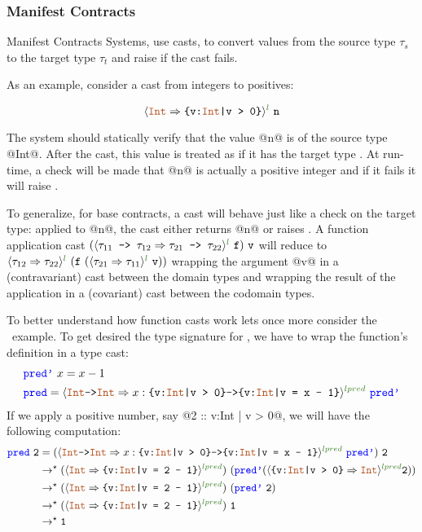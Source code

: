 \subsubsection{Manifest Contracts}

Manifest Contracts Systems\cite{Greenberg12}, use casts,
to convert values from the source type $\tau_s$ 
to the target type $\tau_t$ and raise 
if the cast fails.

As an example, consider a cast from integers to positives:

$$
\ecast{\tyint}{\ttpos}{l} \ \texttt{n}
$$

The system should statically verify that the value @n@ is 
of the source type @Int@.
After the cast, this value is treated as
if it has the target type \ttpos.
At run-time, a check will be made that @n@ 
is actually a positive integer and if it fails it will raise .

To generalize, for base contracts, a cast will behave just like a check on the target type: 
applied to @n@, the cast either returns @n@ or raises  . 
%
A function application cast 
$(\ecast{\tau_{11} \texttt{ -> } \tau_{12}}{\tau_{21} \texttt{ -> } \tau_{22}}{l} \ \texttt{f} ) \ \texttt{v}$
will reduce to 
$\ecast{\tau_{12}}{\tau_{22}}{l}\ (
	\texttt{f} \ 
	(
		\ecast{\tau_{21}}{\tau_{11}}{l} 
		\ \texttt{v}
	)
)$
wrapping the argument @v@ in a (contravariant) cast between the domain types
and wrapping the result of the application in a (covariant) cast between the
codomain types.

To better understand how function casts work lets once more consider 
the \predname\ example.
%
To get desired the type signature for \predname, 
we have to wrap the function's definition 
in a type cast:
\begin{align*}
& \prednamep\ x= x - 1 \\
& \predname  = \ecast{\tyint \texttt{->} \tyint}{x:\ttpos \texttt{->} \ttpred{x}}{lpred} \ \prednamep
\end{align*}
If we apply a positive number, say @2 :: {v:Int | v > 0}@, we will have the following computation:
%
\begin{align*}
\predname\ \texttt{2} &=
(\ecast{\tyint \texttt{->} \tyint}{x:\ttpos \texttt{->} \ttpred{x}}{lpred} \ \prednamep)\ \texttt{2} \\
&\rightarrow^\star (\ecast{\tyint}{\ttpred{2}}{lpred}) \ (\prednamep(\ecast{\ttpos}{\tyint}{lpred}\texttt{2})) \\ 
&\rightarrow^\star (\ecast{\tyint}{\ttpred{2}}{lpred}) \ (\prednamep\ \texttt{2}) \\ 
&\rightarrow^\star (\ecast{\tyint}{\ttpred{2}}{lpred}) \ \texttt{1} \\ 
&\rightarrow^\star \texttt{1} \\ 
\end{align*}

